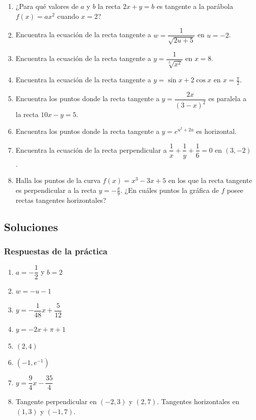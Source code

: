 \documentclass[12pt]{article}
\begin{document}
\begin{enumerate}
    \item ¿Para qué valores de $a$ y $b$ la recta $2x + y = b$ es tangente a la parábola $f(x) = ax^2$ cuando $x = 2$?
    \item Encuentra la ecuación de la recta tangente a $w = \dfrac{1}{\sqrt{2u + 5}}$ en $u = -2$.
    \item Encuentra la ecuación de la recta tangente a $y = \dfrac{1}{\sqrt[3]{x^2}}$ en $x = 8$.
    \item Encuentra la ecuación de la recta tangente a $y = \sin x + 2\cos x$ en $x = \frac{\pi}{2}$.
    \item Encuentra los puntos donde la recta tangente a $y = \dfrac{2x}{(3 - x)^2}$ es paralela a la recta $10x - y = 5$.
    \item Encuentra los puntos donde la recta tangente a $y = e^{u^2 + 2u}$ es horizontal.
    \item Encuentra la ecuación de la recta perpendicular a $\dfrac{1}{x} + \dfrac{1}{y} + \dfrac{1}{6} = 0$ en $(3, -2)$.
    \item Halla los puntos de la curva $f(x) = x^3 - 3x + 5$ en los que la recta tangente es perpendicular a la recta $y = -\frac{x}{9}$. ¿En cuáles puntos la gráfica de $f$ posee rectas tangentes horizontales?
\end{enumerate}



\subsection{Soluciones}

\subsubsection{Respuestas de la práctica}


\begin{enumerate}
    \item $a = -\dfrac{1}{2}$ y $b = 2$
    \item $w = -u - 1$
    \item $y = -\dfrac{1}{48}x + \dfrac{5}{12}$
    \item $y = -2x + \pi + 1$
    \item $(2, 4)$
    \item $\left(-1, e^{-1}\right)$
    \item $y = \dfrac{9}{4}x - \dfrac{35}{4}$
    \item Tangente perpendicular en $(-2, 3)$ y $(2, 7)$. Tangentes horizontales en $(1, 3)$ y $(-1, 7)$.
\end{enumerate}
\end{document}
